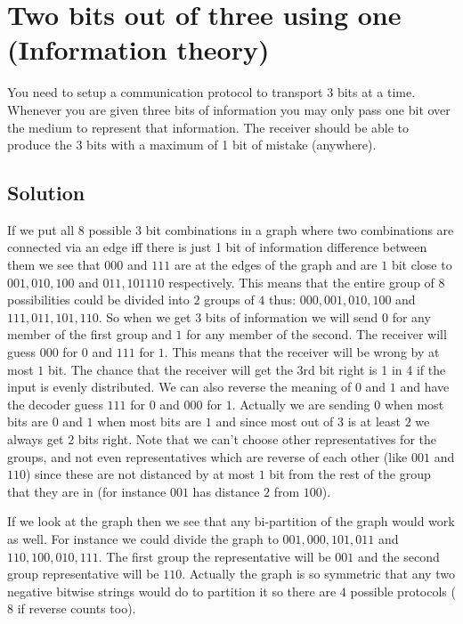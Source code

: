 \section {Two bits out of three using one (Information theory)}
You need to setup a communication protocol to transport $3$ bits at a time. Whenever you are given three bits of information you may only pass one bit over the medium to represent that information. The receiver should be able to produce the $3$ bits with a maximum of 1 bit of mistake (anywhere).

\subsection{Solution}
If we put all $8$ possible $3$ bit combinations in a graph where two combinations are connected via an edge iff there is just 1 bit of information difference between them we see that $000$ and $111$ are at the edges of the graph and are $1$ bit close to $001, 010, 100$ and $011, 101 110$ respectively. This means that the entire group of $8$ possibilities could be divided into $2$ groups of $4$ thus: $000, 001, 010, 100$ and $111, 011, 101, 110$. So when we get $3$ bits of information we will send $0$ for any member of the first group and $1$ for any member of the second. The receiver will guess $000$ for $0$ and $111$ for $1$. This means that the receiver will be wrong by at most $1$ bit. The chance that the receiver will get the 3rd bit right is 1 in 4 if the input is evenly distributed. We can also reverse the meaning of $0$ and $1$ and have the decoder guess $111$ for $0$ and $000$ for $1$. Actually we are sending $0$ when most bits are $0$ and $1$ when most bits are $1$ and since most out of $3$ is at least $2$ we always get $2$ bits right. Note that we can't choose other representatives for the groups, and not even representatives which are reverse of each other (like $001$ and $110$) since these are not distanced by at most $1$ bit from the rest of the group that they are in (for instance $001$ has distance $2$ from $100$).

\begin{center}
\end{center}

If we look at the graph then we see that any bi-partition of the graph would work as well. For instance we could divide the graph to $001, 000, 101, 011$ and $110, 100, 010, 111$. The first group the representative will be $001$ and the second group representative will be $110$. Actually the graph is so symmetric that any two negative bitwise strings would do to partition it so there are $4$ possible protocols ($8$ if reverse counts too).
